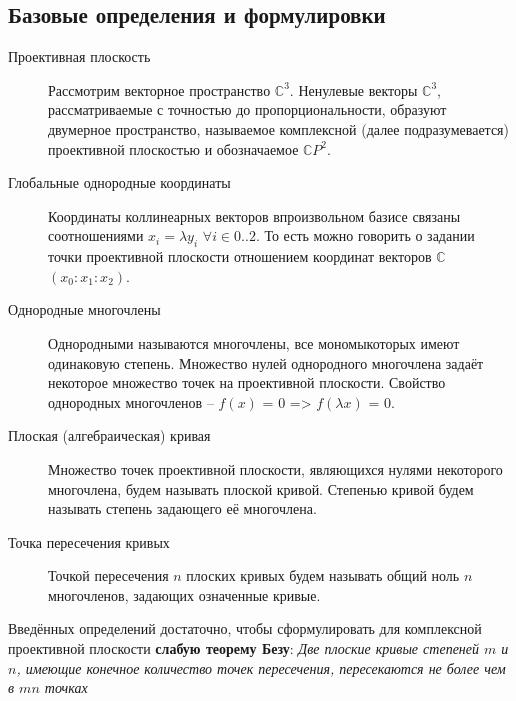 \documentclass[a4paper, 12pt]{article}
\begin{document}
\subsection{Базовые определения и формулировки}
\begin{description}
\item[Проективная плоскость]
Рассмотрим векторное пространство $\mathbb{C}^3$. Ненулевые векторы $\mathbb{C}^3$, рассматриваемые с точностью до пропорциональности, образуют двумерное пространство, называемое комплексной (далее подразумевается) проективной плоскостью и обозначаемое $\mathbb{C}P^2$.
\item[Глобальные однородные координаты]
Координаты коллинеарных векторов в\newline произвольном базисе связаны соотношениями $x_i = \lambda y_i$ $\forall i \in {0..2}$. То есть можно говорить о задании точки проективной плоскости отношением координат векторов $\mathbb{C}$ $(x_0:x_1:x_2)$.
\end{description}
\begin{description}
\item[Однородные многочлены] Однородными называются многочлены, все мономы\newline которых имеют одинаковую степень. Множество нулей однородного многочлена задаёт некоторое множество точек на проективной плоскости. Свойство однородных многочленов -- $f(x)$ = $0$ => $f(\lambda x)$ = $0$.
\item[Плоская (алгебраическая) кривая]
Множество точек проективной плоскости\newline, являющихся нулями некоторого многочлена, будем называть плоской кривой. Степенью кривой будем называть степень задающего её многочлена.
\item[Точка пересечения кривых]
Точкой пересечения $n$ плоских кривых будем называть общий ноль $n$ многочленов, задающих означенные кривые.
\end{description}
Введённых определений достаточно, чтобы сформулировать для комплексной проективной плоскости \textbf{слабую теорему Безу}:
\textit{Две плоские кривые степеней $m$ и $n$, имеющие конечное количество точек пересечения, пересекаются не более чем в $mn$ точках}
\end{document}
